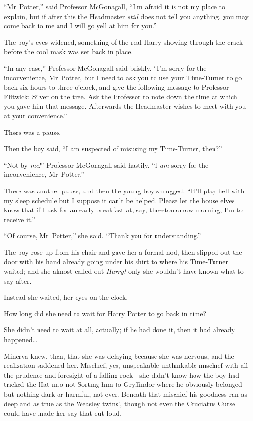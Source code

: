 “Mr~Potter,” said Professor McGonagall, “I’m afraid it is not my place to explain, but if after this the Headmaster \emph{still} does not tell you anything, you may come back to me and I will go yell at him for you.”

The boy’s eyes widened, something of the real Harry showing through the crack before the cool mask was set back in place.

“In any case,” Professor McGonagall said briskly. “I’m sorry for the inconvenience, Mr~Potter, but I need to ask you to use your Time-Turner to go back six hours to three o’clock, and give the following message to Professor Flitwick: Silver on the tree. Ask the Professor to note down the time at which you gave him that message. Afterwards the Headmaster wishes to meet with you at your convenience.”

There was a pause.

Then the boy said, “I am suspected of misusing my Time-Turner, then?”

“Not by \emph{me!}” Professor McGonagall said hastily. “I \emph{am} sorry for the inconvenience, Mr~Potter.”

There was another pause, and then the young boy shrugged. “It’ll play hell with my sleep schedule but I suppose it can’t be helped. Please let the house elves know that if I ask for an early breakfast at, say, three\am tomorrow morning, I’m to receive it.”

“Of course, Mr~Potter,” she said. “Thank you for understanding.”

The boy rose up from his chair and gave her a formal nod, then slipped out the door with his hand already going under his shirt to where his Time-Turner waited; and she almost called out \emph{Harry!} only she wouldn’t have known what to say after.

Instead she waited, her eyes on the clock.

How long did she need to wait for Harry Potter to go back in time?

She didn’t need to wait at all, actually; if he had done it, then it had already happened…

Minerva knew, then, that she was delaying because she was nervous, and the realization saddened her. Mischief, yes, unspeakable unthinkable mischief with all the prudence and foresight of a falling rock—she didn’t know how the boy had tricked the Hat into not Sorting him to Gryffindor where he obviously belonged—but nothing dark or harmful, not ever. Beneath that mischief his goodness ran as deep and as true as the Weasley twins’, though not even the Cruciatus Curse could have made her say that out loud.

